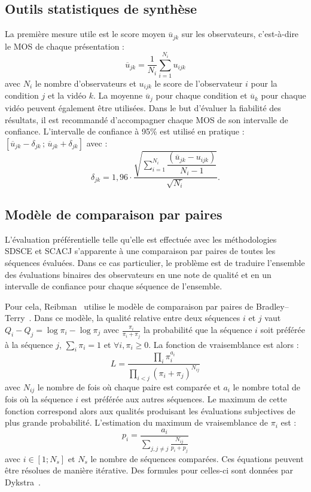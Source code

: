 \subsection{Outils statistiques de synthèse}
La première mesure utile est le score moyen $\overline{u}_{jk}$ sur les observateurs, c'est-à-dire le MOS de chaque présentation :
\begin{equation}
\overline{u}_{jk} = \frac{1}{N_i} \sum\limits^{N_i}_{i=1} u_{ijk}
\end{equation}
%
avec $N_i$ le nombre d'observateurs et $u_{ijk}$ le score de l'observateur $i$ pour la condition $j$ et la vidéo $k$. La moyenne $\overline{u}_j$ pour chaque condition et $\overline{u}_k$ pour chaque vidéo peuvent également être utilisées. Dans le but d'évaluer la fiabilité des résultats, il est recommandé d'accompagner chaque MOS de son intervalle de confiance. L'intervalle de confiance à 95\% est utilisé en pratique : $[\overline{u}_{jk} - \delta_{jk}\, ;\, \overline{u}_{jk} + \delta_{jk}]$ avec :
\begin{equation}
\delta_{jk} = 1,96\cdot \dfrac{\sqrt{\sum\limits_{i=1}^{N_i} \dfrac{(\overline{u}_{jk} - u_{ijk})}{N_i-1}}}{\sqrt{N_i}}.
\end{equation}


\subsection{Modèle de comparaison par paires}
L'évaluation préférentielle telle qu'elle est effectuée avec les méthodologies SDSCE et SCACJ s'apparente à une comparaison par paires de toutes les séquences évaluées. Dans ce cas particulier, le problème est de traduire l'ensemble des évaluations binaires des observateurs en une note de qualité et en un intervalle de confiance pour chaque séquence de l'ensemble.

Pour cela, Reibman~\cite{reibman-vpqm2006} utilise le modèle de comparaison par paires de Bradley--Terry~\cite{bradley-biometrika}. Dans ce modèle, la qualité relative entre deux séquences $i$ et $j$ vaut $Q_i - Q_j = \log \pi_i - \log \pi_j$ avec $\frac{\pi_i}{\pi_i+\pi_j}$ la probabilité que la séquence $i$ soit préférée à la séquence $j$, $\sum_i \pi_i = 1$ et $\forall i, \pi_i \geqslant 0$. La fonction de vraisemblance est alors :
\begin{equation}
L = \frac{\prod\limits_i \pi_{i}^{a_i}}{\prod\limits_{i<j} (\pi_i + \pi_j)^{N_{\textit{ij}}}}
\end{equation}
%
avec $N_{\textit{ij}}$ le nombre de fois où chaque paire est comparée et $a_i$ le nombre total de fois où la séquence $i$ est préférée aux autres séquences. Le maximum de cette fonction correspond alors aux qualités produisant les évaluations subjectives de plus grande probabilité. L'estimation du maximum de vraisemblance de $\pi_i$ est :
\begin{equation}
p_i = \frac{a_i}{\sum\limits_{j, j\neq j} \frac{N_{\textit{ij}}}{p_i + p_j}}
\end{equation}
%
avec $i \in [1;N_s]$ et $N_s$ le nombre de séquences comparées. Ces équations peuvent être résolues de manière itérative. Des formules pour celles-ci sont données par Dykstra~\cite{dykstra-biometrics}.%

